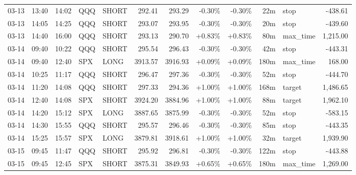 \documentclass[11pt,a4paper,twoside]{article}
\begin{document}
\begin{center}
\begin{longtable}{>{\color{txtmain}}l l l l l r r r r r >{\color{txtmain}}l r}
03-13 & 13:40 & 14:02 & QQQ & SHORT & 292.41 & 293.29 & \textcolor{lossred}{-0.30\%} & \textcolor{lossred}{-0.30\%} & 22m & stop & \textcolor{lossred}{-438.61} \\
03-13 & 14:05 & 14:25 & QQQ & SHORT & 293.07 & 293.95 & \textcolor{lossred}{-0.30\%} & \textcolor{lossred}{-0.30\%} & 20m & stop & \textcolor{lossred}{-439.60} \\
03-13 & 14:40 & 16:00 & QQQ & SHORT & 293.13 & 290.70 & \textcolor{wingreen}{+0.83\%} & \textcolor{wingreen}{+0.83\%} & 80m & max\_time & \textcolor{wingreen}{1,215.00} \\
03-14 & 09:40 & 10:22 & QQQ & SHORT & 295.54 & 296.43 & \textcolor{lossred}{-0.30\%} & \textcolor{lossred}{-0.30\%} & 42m & stop & \textcolor{lossred}{-443.31} \\
03-14 & 09:40 & 12:40 & SPX & LONG & 3913.57 & 3916.93 & \textcolor{wingreen}{+0.09\%} & \textcolor{wingreen}{+0.09\%} & 180m & max\_time & \textcolor{wingreen}{168.00} \\
03-14 & 10:25 & 11:17 & QQQ & SHORT & 296.47 & 297.36 & \textcolor{lossred}{-0.30\%} & \textcolor{lossred}{-0.30\%} & 52m & stop & \textcolor{lossred}{-444.70} \\
03-14 & 11:20 & 14:08 & QQQ & SHORT & 297.33 & 294.36 & \textcolor{wingreen}{+1.00\%} & \textcolor{wingreen}{+1.00\%} & 168m & target & \textcolor{wingreen}{1,486.65} \\
03-14 & 12:40 & 14:08 & SPX & SHORT & 3924.20 & 3884.96 & \textcolor{wingreen}{+1.00\%} & \textcolor{wingreen}{+1.00\%} & 88m & target & \textcolor{wingreen}{1,962.10} \\
03-14 & 14:20 & 15:12 & SPX & LONG & 3887.65 & 3875.99 & \textcolor{lossred}{-0.30\%} & \textcolor{lossred}{-0.30\%} & 52m & stop & \textcolor{lossred}{-583.15} \\
03-14 & 14:30 & 15:55 & QQQ & SHORT & 295.57 & 296.46 & \textcolor{lossred}{-0.30\%} & \textcolor{lossred}{-0.30\%} & 85m & stop & \textcolor{lossred}{-443.35} \\
03-14 & 15:25 & 15:57 & SPX & LONG & 3879.81 & 3918.61 & \textcolor{wingreen}{+1.00\%} & \textcolor{wingreen}{+1.00\%} & 32m & target & \textcolor{wingreen}{1,939.90} \\
03-15 & 09:45 & 11:47 & QQQ & SHORT & 295.92 & 296.81 & \textcolor{lossred}{-0.30\%} & \textcolor{lossred}{-0.30\%} & 122m & stop & \textcolor{lossred}{-443.88} \\
03-15 & 09:45 & 12:45 & SPX & SHORT & 3875.31 & 3849.93 & \textcolor{wingreen}{+0.65\%} & \textcolor{wingreen}{+0.65\%} & 180m & max\_time & \textcolor{wingreen}{1,269.00} \\

\end{longtable}
\end{center}
\end{document}
